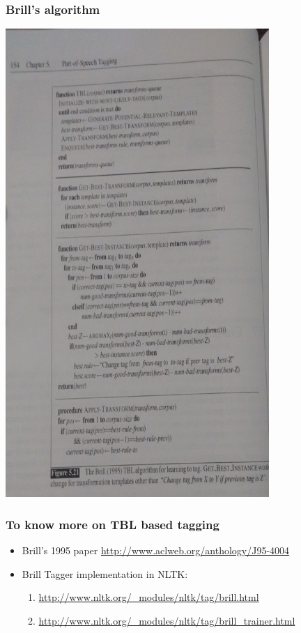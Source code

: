 \documentclass{beamer}
\begin{document}
\begin{frame}
\frametitle{Brill's algorithm}
\includegraphics[width=0.75\textwidth,angle=-90,keepaspectratio]{Brill-2-b.jpg}
\end{frame}

\begin{frame}
\frametitle{To know more on TBL based tagging}
\begin{itemize}
\item Brill's 1995 paper \url{http://www.aclweb.org/anthology/J95-4004}
\item Brill Tagger implementation in NLTK: 
\begin{enumerate}
\item \url{http://www.nltk.org/_modules/nltk/tag/brill.html}
\item \url{http://www.nltk.org/_modules/nltk/tag/brill_trainer.html}
\end{enumerate}
\end{itemize}
\end{frame}
\end{document}
